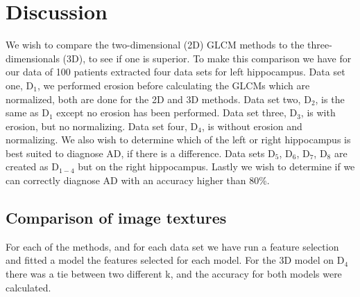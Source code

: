 \chapter{Discussion}

We wish to compare the two-dimensional (2D) GLCM methods to the three-dimensionals (3D), to see if one is superior. To make this comparison we have for our data of 100 patients extracted four data sets for left hippocampus. Data set one, D$_1$, we performed erosion before calculating the GLCMs which are normalized, both are done for the 2D and 3D methods. Data set two, D$_2$, is the same as D$_1$ except no erosion has been performed. Data set three, D$_3$, is with erosion, but no normalizing. Data set four, D$_4$, is without erosion and normalizing.
We also wish to determine which of the left or right hippocampus is best suited to diagnose AD, if there is a difference. Data sets D$_5$, D$_6$, D$_7$, D$_8$ are created as D$_{1-4}$ but on the right hippocampus. 
Lastly we wish to determine if we can correctly diagnose AD with an accuracy higher than 80\%.


\section{Comparison of image textures}
For each of the methods, and for each data set we have run a feature selection and fitted a model the features selected for each model. For the 3D model on D$_4$ there was a tie between two different k, and the accuracy for both models were calculated.

